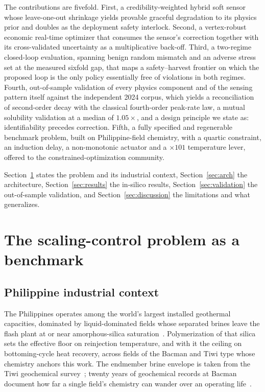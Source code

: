 \documentclass[review,number,sort&compress]{elsarticle}
\begin{document}
The contributions are fivefold. First, a credibility-weighted hybrid
soft sensor whose leave-one-out shrinkage yields provable graceful
degradation to its physics prior and doubles as the deployment safety
interlock. Second, a vertex-robust economic real-time optimizer that
consumes the sensor's correction together with its cross-validated
uncertainty as a multiplicative back-off. Third, a two-regime
closed-loop evaluation, spanning benign random mismatch and an adverse
stress set at the measured sixfold gap, that maps a safety--harvest
frontier on which the proposed loop is the only policy essentially free
of violations in both regimes. Fourth, out-of-sample validation of
every physics component and of the sensing pattern itself against the
independent 2024 corpus, which yields a reconciliation of second-order
decay with the classical fourth-order peak-rate law, a mutual
solubility validation at a median of $1.05\times$, and a design
principle we state as: identifiability precedes correction. Fifth, a
fully specified and regenerable benchmark problem, built on
Philippine-field chemistry, with a quartic constraint, an induction
delay, a non-monotonic actuator and a $\times 101$ temperature lever,
offered to the constrained-optimization community.

Section~\ref{sec:benchmark} states the problem and its industrial
context, Section~\ref{sec:arch} the architecture,
Section~\ref{sec:results} the in-silico results,
Section~\ref{sec:validation} the out-of-sample validation, and
Section~\ref{sec:discussion} the limitations and what generalizes.

\section{The scaling-control problem as a benchmark}\label{sec:benchmark}

\subsection{Philippine industrial context}\label{sec:phcontext}

The Philippines operates among the world's largest installed geothermal
capacities, dominated by liquid-dominated fields whose separated brines
leave the flash plant at or near amorphous-silica
saturation~\citep{fronda2020country}. Polymerization of that silica
sets the effective floor on reinjection temperature, and with it the
ceiling on bottoming-cycle heat recovery, across fields of the Bacman
and Tiwi type whose chemistry anchors this work. The endmember brine
envelope is taken from the Tiwi geochemical
survey~\citep{sugiaman2004geochemical}; twenty years of geochemical
records at Bacman document how far a single field's chemistry can
wander over an operating life~\citep{espartinez2015bacman}.
\end{document}
